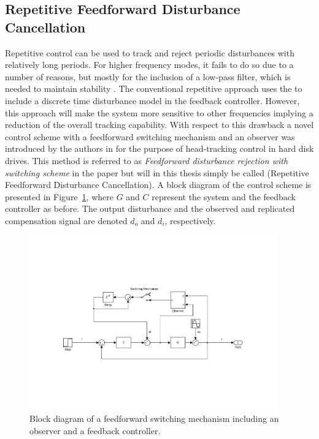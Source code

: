 \subsection{Repetitive Feedforward Disturbance Cancellation}
Repetitive control can be used to track and reject periodic disturbances with relatively long periods. For higher frequency modes, it fails to do so due to a number of reasons, but mostly for the inclusion of a low-pass filter, which is needed to maintain stability \citep{fujimoto2009rro}. The conventional repetitive approach uses the \abbrIMP to include a discrete time disturbance model in the feedback controller. However, this approach will make the system more sensitive to other frequencies implying a reduction of the overall tracking capability. With respect to this drawback a novel control scheme with a feedforward switching mechanism and an observer was introduced by the authors in \citep{fujimoto2004repetitive} for the purpose of head-tracking control in hard disk drives. This method is referred to as \emph{Feedforward disturbance rejection with switching
scheme} in the paper but will in this thesis simply be called \abbrRFDC (Repetitive Feedforward Disturbance Cancellation). A block diagram of the control scheme is presented in Figure~\ref{fig:ffrep}, where $G$ and $C$ represent the system and the feedback controller as before. The output disturbance and the observed and replicated compensation signal are denoted $d_o$ and $d_i$, respectively.

\begin{figure}[h]
  \centering %
  \includegraphics[width=0.95\textwidth, trim=6cm 5.5cm 5.2cm 5.5cm, clip=true]{fig/matlab/ffrep}
  \caption{\label{fig:ffrep}Block diagram of a feedforward switching mechanism including an observer and a feedback controller.}
\end{figure}

